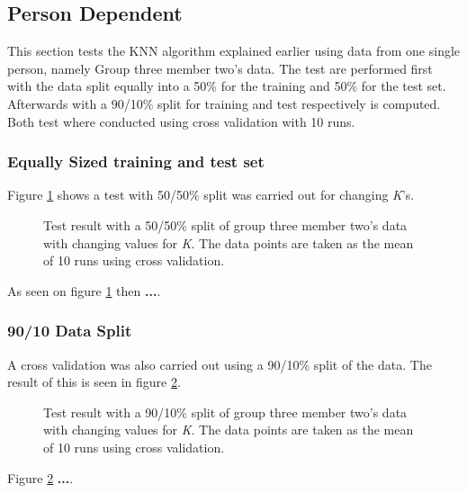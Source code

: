 \subsection{Person Dependent}
This section tests the KNN algorithm explained earlier using data from one single person, namely Group three member two's data.
The test are performed first with the data split equally into a 50\% for the training and 50\% for the test set.
Afterwards with a 90/10\% split for training and test respectively is computed.
Both test where conducted using cross validation with 10 runs.

\subsubsection{Equally Sized training and test set}
Figure \ref{fig:PersonDependentPerformance_5050} shows a test with 50/50\% split was carried out for changing \textit{K}'s.

\begin{figure}[H]
\centering
\caption{Test result with a 50/50\% split of group three member two's data with changing values for \textit{K}. The data points are taken as the mean of 10 runs using cross validation.}
\label{fig:PersonDependentPerformance_5050}
\end{figure}

As seen on figure \ref{fig:PersonDependentPerformance_5050} then \textbf{...}.


\subsubsection{90/10 Data Split}
A cross validation was also carried out using a 90/10\% split of the data. 
The result of this is seen in figure \ref{fig:PersonDependentPerformance_9010}.


\begin{figure}[H]
\centering
\caption{Test result with a 90/10\% split of group three member two's data with changing values for \textit{K}. The data points are taken as the mean of 10 runs using cross validation.}
\label{fig:PersonDependentPerformance_9010}
\end{figure}

Figure \ref{fig:PersonDependentPerformance_9010} \textbf{...}.

